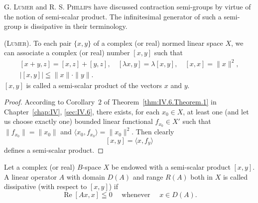 \label{sec:IX.8}

G. \textsc{Lumer} and R. S. \textsc{Phillips} have discussed contraction semi-groups by virtue of the notion of semi-scalar product. The infinitesimal generator of such a semi-group is dissipative in their terminology. 

\begin{propositionu} (\textsc{Lumer}). To each pair $\{x, y\}$ of a complex (or real) normed linear space $X$, we can associate a complex (or real) number $[x, y]$ such that 
\begin{equation}\label{eq:IX.8.1}
\begin{gathered}
{}[ x + y, z ] = [ x, z ] + [ y, z ], \quad [ \lambda x, y ] = \lambda [ x, y ], \quad [ x, x ] = \| x \| ^{2},
\\
| [ x, y ] | \leqq \| x \| \cdot \| y \|.
\end{gathered}
\end{equation}
$[x, y]$ is called a semi-scalar product of the vectors $x$ and $y$. 
\end{propositionu}

\begin{proof}
 According to Corollary~\hyperref[cor:IV.6.Corollary.2]{$2$} of Theorem~\ref{thm:IV.6.Theorem.1} in Chapter~\ref{chap:IV}, \ref{sec:IV.6}, there exists, for each $x_0 \in X$, at least one (and let us choose exactly one) bounded linear functional $f_{x_0} \in X'$ such that $\|f_{x_0}\| = \|x_0\|$ and $\langle x_0, f_{x_0} \rangle = \|x_0\|^2$. Then clearly 
\begin{equation}\label{eq:IX.8.2}
[ x, y ] = \langle x, f _{y} \rangle
\end{equation}
defines a semi-scalar product. 
\end{proof}

\begin{definitionu} Let a complex (or real) $B$-space $X$ be endowed with a semi-scalar product $[x, y]$. A linear operator $A$ with domain $D(A)$ and range $R(A)$ both in $X$ is called dissipative (with respect to $[x, y]$) if 
\begin{equation}\label{eq:IX.8.3}
\operatorname{Re} [ A x, x ] \leqq 0 \quad \text{ whenever } \quad x \in D (A).
\end{equation}
\end{definitionu}

